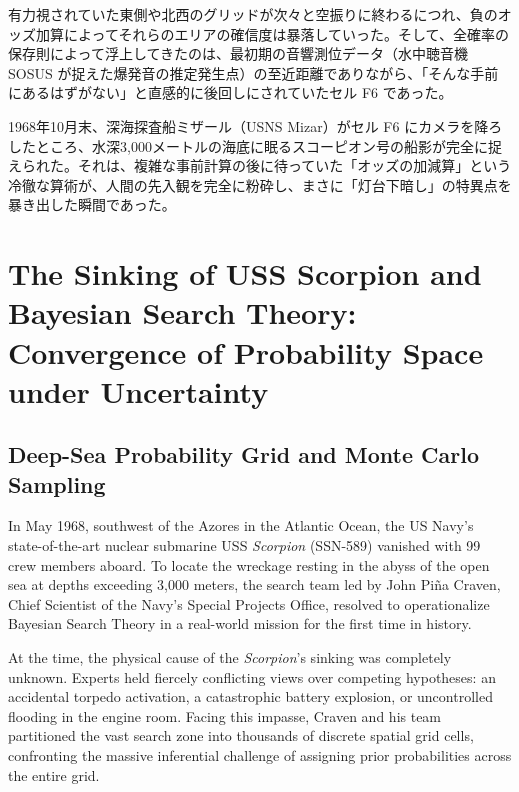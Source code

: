     有力視されていた東側や北西のグリッドが次々と空振りに終わるにつれ、負のオッズ加算によってそれらのエリアの確信度は暴落していった。そして、全確率の保存則によって浮上してきたのは、最初期の音響測位データ（水中聴音機 SOSUS が捉えた爆発音の推定発生点）の至近距離でありながら、「そんな手前にあるはずがない」と直感的に後回しにされていたセル F6 であった。

    1968年10月末、深海探査船ミザール（USNS Mizar）がセル F6 にカメラを降ろしたところ、水深3,000メートルの海底に眠るスコーピオン号の船影が完全に捉えられた。それは、複雑な事前計算の後に待っていた「オッズの加減算」という冷徹な算術が、人間の先入観を完全に粉砕し、まさに「灯台下暗し」の特異点を暴き出した瞬間であった。
\else
    \section{The Sinking of USS Scorpion and Bayesian Search Theory: Convergence of Probability Space under Uncertainty}
    \label{sec:scorpion_search}

    \subsection{Deep-Sea Probability Grid and Monte Carlo Sampling}

    In May 1968, southwest of the Azores in the Atlantic Ocean, the US Navy's state-of-the-art nuclear submarine USS \textit{Scorpion} (SSN-589) vanished with 99 crew members aboard. To locate the wreckage resting in the abyss of the open sea at depths exceeding 3,000 meters, the search team led by John Piña Craven, Chief Scientist of the Navy's Special Projects Office, resolved to operationalize Bayesian Search Theory in a real-world mission for the first time in history.

    At the time, the physical cause of the \textit{Scorpion}'s sinking was completely unknown. Experts held fiercely conflicting views over competing hypotheses: an accidental torpedo activation, a catastrophic battery explosion, or uncontrolled flooding in the engine room. Facing this impasse, Craven and his team partitioned the vast search zone into thousands of discrete spatial grid cells, confronting the massive inferential challenge of assigning prior probabilities across the entire grid.

